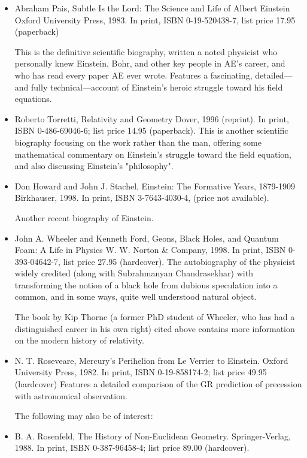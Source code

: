 \documentclass[10pt,a4paper]{book}
\theoremstyle{definition}
\begin{document}
\begin{itemize}
\item Abraham Pais,
Subtle Is the Lord: The Science and Life of Albert Einstein
Oxford University Press, 1983.
In print, ISBN 0-19-520438-7, list price 17.95 (paperback)

This is the definitive scientific biography, written a noted physicist who personally knew Einstein, Bohr, and other key people in AE's career, and who has read every paper AE ever wrote.  Features a fascinating, detailed—and fully technical—account of Einstein's heroic struggle toward his field equations.

\item Roberto Torretti,
Relativity and Geometry
Dover, 1996 (reprint).
In print, ISBN 0-486-69046-6; list price 14.95 (paperback).
This is another scientific biography focusing on the work rather than the man, offering some mathematical commentary on Einstein's struggle toward the field equation, and also discussing Einstein's "philosophy".

\item Don Howard and John J. Stachel,
Einstein: The Formative Years, 1879-1909
Birkhauser, 1998.
In print, ISBN 3-7643-4030-4, (price not available).

Another recent biography of Einstein.

\item John A. Wheeler and Kenneth Ford,
Geons, Black Holes, and Quantum Foam: A Life in Physics
W. W. Norton \& Company, 1998.
In print, ISBN 0-393-04642-7, list price 27.95 (hardcover).
The autobiography of the physicist widely credited (along with Subrahmanyan Chandrasekhar) with transforming the notion of a black hole from dubious speculation into a common, and in some ways, quite well understood natural object.

The book by Kip Thorne (a former PhD student of Wheeler, who has had a distinguished career in his own right) cited above contains more information on the modern history of relativity.

\item N. T. Roseveare,
Mercury's Perihelion from Le Verrier to Einstein.
Oxford University Press, 1982.
In print, ISBN 0-19-858174-2; list price 49.95 (hardcover)
Features a detailed comparison of the GR prediction of precession with astronomical observation.

The following may also be of interest:

\item B. A. Rosenfeld,
The History of Non-Euclidean Geometry.
Springer-Verlag, 1988.
In print, ISBN 0-387-96458-4; list price 89.00 (hardcover).


\end{itemize}
\end{document}
